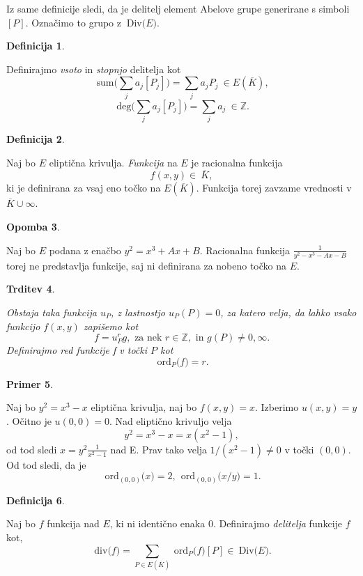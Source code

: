 \documentclass[12pt,a4paper,twoside]{article}
\theoremstyle{definition} %
\newtheorem{definicija}{Definicija}[section]
\newtheorem{primer}[definicija]{Primer}
\newtheorem{opomba}[definicija]{Opomba}
\theoremstyle{plain} %
\newtheorem{trditev}[definicija]{Trditev}
\numberwithin{equation}{section}  %
\newcommand{\Z}{\mathbb Z}
\newcommand{\E}[1]{E({#1})}
\newcommand{\DIV}[1]{\ \text{Div(}{#1}\text{)}}
\newcommand{\DEG}[1]{\ \text{deg(}{#1}\text{)}}
\newcommand{\Div}[1]{\ \text{div(}{#1}\text{)}}
\newcommand{\SUM}[1]{\ \text{sum(}{#1}\text{)}}
\newcommand{\ORDp}[2]{\ \text{ord}_{#2}({#1}\text{)}}
\begin{document}
Iz same definicije sledi, da je delitelj element Abelove grupe generirane s simboli $[P]$. Označimo to grupo z $\DIV{E}$.


\begin{definicija}~

Definirajmo \emph{vsoto} in \emph{stopnjo} delitelja kot
$$\SUM{\sum_{j}a_j[P_j]} = \sum_ja_jP_j \ \in \E{\overline{K}},$$
$$\DEG{\sum_{j}a_j[P_j]} = \sum_ja_j \ \in \Z.$$

\end{definicija}


\begin{definicija}~

Naj bo $E$ eliptična krivulja. \emph{Funkcija} na $E$ je racionalna funkcija $$f(x,y) \in \ \overline{K},$$ ki je definirana za vsaj eno točko na $\E{\overline{K}}$. Funkcija torej zavzame vrednosti v $\overline{K} \cup {\infty}$.
\end{definicija}

\begin{opomba}~

Naj bo $E$ podana z enačbo $y^2 = x^3+Ax+B$. Racionalna funkcija $\frac{1}{y^2-x^3-Ax-B}$ torej ne predstavlja funkcije, saj ni definirana za nobeno točko na $E$.

\end{opomba}

\begin{trditev}~

Obstaja taka funkcija $u_P$,  z lastnostjo $u_P(P) = 0$, za katero velja, da lahko vsako funkcijo $f(x,y)$ zapišemo kot
$$f = u^r_Pg, \text{ za nek } r\in \Z,\text{ in } g(P) \neq 0,\infty.$$
Definirajmo \emph{red} funkcije f v točki $P$ kot
$$\ORDp{f}{P}=r.$$
\end{trditev}

\begin{primer}~

Naj bo $y^2 = x^3-x$ eliptična krivulja, naj bo $f(x,y) = x$. Izberimo $u(x,y) = y$. Očitno je $u(0,0) = 0$. Nad eliptično krivuljo velja 
$$y^2 = x^3-x = x(x^2-1),$$ 
od tod sledi $x = y^2\frac{1}{x^2-1}$ nad E.
Prav tako velja $1/(x^2-1) \neq 0$ v točki $(0,0)$. Od tod sledi, da je 
$$\ORDp{x}{(0,0)} = 2,\  \ORDp{x/y}{(0,0)}= 1.$$
\end{primer}

\begin{definicija}~

Naj bo $f$ funkcija nad $E$, ki ni identično enaka $0$. Definirajmo \emph{delitelja} funkcije $f$ kot,
$$\Div{f} = \sum_{P\in \E{\overline{K}}} \ORDp{f}{P}[P] \in \DIV{E}.$$
\end{definicija}
\end{document}
